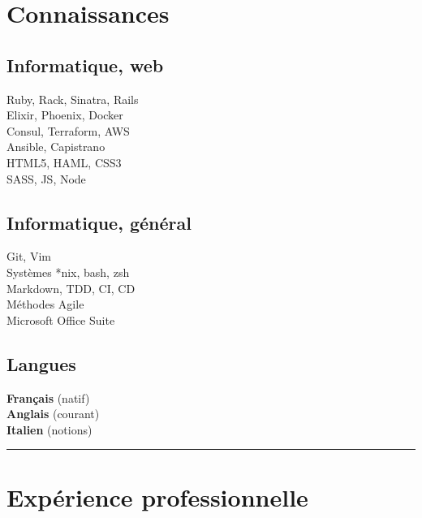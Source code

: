 \documentclass[a4paper,11pt]{article}
\newcommand{\breakvspace}[1]{\pagebreak[2]\vspace{#1}\pagebreak[2]}
\newcommand{\nobreakvspace}[1]{\nopagebreak[4]\vspace{#1}\nopagebreak[4]}
\newcommand{\spacedhrule}[2]{\breakvspace{#1}\hrule\nobreakvspace{#2}}
\begin{document}
\section*{Connaissances}
  \begin{minipage}[t]{0.29\textwidth}
    \subsection*{Informatique, web}
    Ruby, Rack, Sinatra, Rails\\
    Elixir, Phoenix, Docker \\
    Consul, Terraform, AWS \\
    Ansible, Capistrano \\
    HTML5, HAML, CSS3 \\
    SASS, JS, Node
  \end{minipage}
  \hspace{0.035\textwidth}
  \vrule
  \hspace{0.035\textwidth}
  \begin{minipage}[t]{0.28\textwidth}
    \subsection*{Informatique, général}
    Git, Vim\\
    Systèmes *nix, bash, zsh\\
    Markdown, TDD, CI, CD\\
    Méthodes Agile \\
    Microsoft Office Suite\\
  \end{minipage}
  \hspace{0.035\textwidth}
  \vrule
  \hspace{0.035\textwidth}
  \begin{minipage}[t]{0.28\textwidth}
    \subsection*{Langues}
    \textbf{Français} (natif)\\
    \textbf{Anglais} (courant)\\
    \textbf{Italien} (notions)
  \end{minipage}


\spacedhrule{1.5em}{-0.4em}

\section*{Expérience professionnelle}
\end{document}
